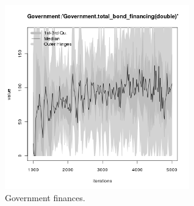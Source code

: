 \begin{figure}[H!]
\begin{minipage}{17cm}
\includegraphics[width=8cm]{./png/tax_0.10/Government-total_bond_financing.png}
\end{minipage}
\caption{Government finances.}
\label{Figure: Government}
\end{figure}
\clearpage

